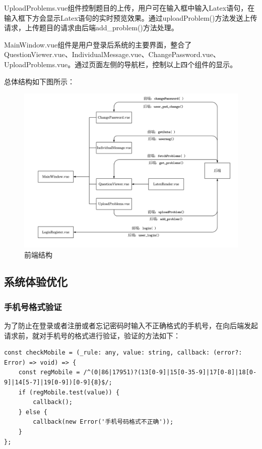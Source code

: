 \documentclass[a4paper,AutoFakeBold={2.7}]{ctexart} %
\begin{document}
UploadProblems.vue组件控制题目的上传，用户可在输入框中输入Latex语句，在输入框下方会显示Latex语句的实时预览效果。通过uploadProblem()方法发送上传请求，上传题目的请求由后端add\_problem()方法处理。

MainWindow.vue组件是用户登录后系统的主要界面，整合了QuestionViewer.vue、IndividualMessage.vue、ChangePassword.vue、UploadProblems.vue。通过页面左侧的导航栏，控制以上四个组件的显示。

总体结构如下图所示：

\begin{figure}[H]
	\centering
	\includegraphics[width=0.85\linewidth]{./图片/前端结构.pdf}
	\caption{前端结构}\label{前端结构}
\end{figure}

\subsection{系统体验优化}

\subsubsection{手机号格式验证}

为了防止在登录或者注册或者忘记密码时输入不正确格式的手机号，在向后端发起请求前，就对手机号的格式进行验证，验证的方法如下：

\begin{lstlisting}
const checkMobile = (_rule: any, value: string, callback: (error?: Error) => void) => {
    const regMobile = /^(0|86|17951)?(13[0-9]|15[0-35-9]|17[0-8]|18[0-9]|14[5-7]|19[0-9])[0-9]{8}$/;
    if (regMobile.test(value)) {
        callback();
    } else {
        callback(new Error('手机号码格式不正确'));
    }
};
\end{lstlisting}
\end{document}
